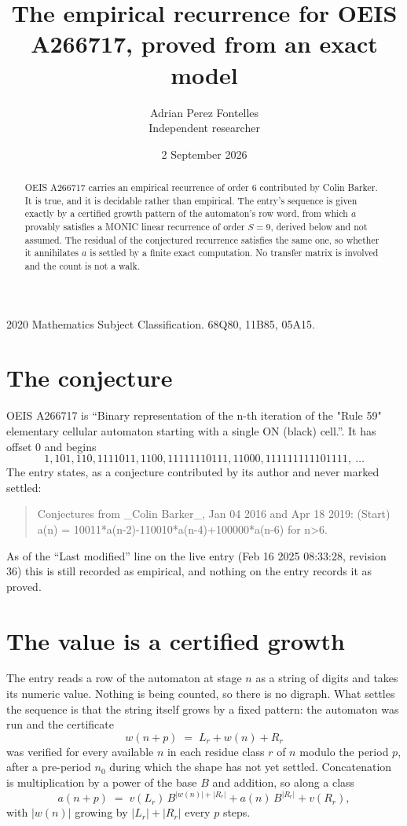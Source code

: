 \documentclass[11pt,a4paper]{article}
\title{The empirical recurrence for OEIS A266717, proved from an exact model}
\author{Adrian Perez Fontelles\\ \small Independent researcher}
\date{2 September 2026}
\theoremstyle{plain}
\theoremstyle{definition}
\begin{document}
\maketitle

\begin{abstract}
OEIS A266717 carries an empirical recurrence of order $6$ contributed by Colin Barker. It is true, and it is
decidable rather than empirical. The entry's sequence is given exactly by a certified growth pattern of the automaton's row word, from
which $a$ provably satisfies a MONIC linear recurrence of order $S=9$, derived below and not
assumed. The residual of the conjectured recurrence satisfies the same one, so whether it
annihilates $a$ is settled by a finite exact computation. No transfer matrix is involved and
the count is not a walk.
\end{abstract}

\noindent\small 2020 Mathematics Subject Classification. 68Q80, 11B85, 05A15.\normalsize

\section{The conjecture}

OEIS A266717 is ``Binary representation of the n-th iteration of the "Rule 59" elementary cellular automaton starting with a single ON (black) cell.''. It has offset $0$ and begins
\[
1, 101, 110, 1111011, 1100, 11111110111, 11000, 111111111101111,\ \dots
\]
The entry states, as a conjecture contributed by its author and never marked settled:
\begin{quote}
Conjectures from \_Colin Barker\_, Jan 04 2016 and Apr 18 2019: (Start) a(n) = 10011*a(n-2)-110010*a(n-4)+100000*a(n-6) for n>6.
\end{quote}
As of the ``Last modified'' line on the live entry (Feb 16 2025 08:33:28, revision 36)
this is still recorded as empirical, and nothing on the entry records it as proved.

\section{The value is a certified growth}

The entry reads a row of the automaton at stage $n$ as a string of digits and takes its
numeric value. Nothing is being counted, so there is no digraph. What settles the sequence is
that the string itself grows by a fixed pattern: the automaton was run and the certificate
\[
w(n+p)\;=\;L_r + w(n) + R_r
\]
was verified for every available $n$ in each residue class $r$ of $n$ modulo the period $p$,
after a pre-period $n_0$ during which the shape has not yet settled. Concatenation is
multiplication by a power of the base $B$ and addition, so along a class
\[
a(n+p)\;=\;v(L_r)\,B^{|w(n)|+|R_r|} + a(n)\,B^{|R_r|} + v(R_r),
\]
with $|w(n)|$ growing by $|L_r|+|R_r|$ every $p$ steps.
\end{document}
